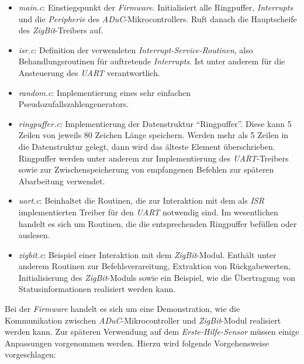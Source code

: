     \begin{itemize}
        \item{\emph{main.c}:} Einstiegspunkt der \emph{Firmware}. Initialisiert alle Ringpuffer, \emph{Interrupts} und 
                       die \emph{Peripherie} des \emph{ADuC}-Mikrocontrollers. Ruft danach die 
                       Hauptscheife des \emph{ZigBit}-Treibers auf.
        \item{\emph{isr.c}:}  Definition der verwendeten \emph{Interrupt-Service-Routinen}, also Behandlungsroutinen
                       für auftretende \emph{Interrupts}. Ist unter anderem für die Ansteuerung des \emph{UART} 
                       verantwortlich.
        \item{\emph{random.c}:} Implementierung eines sehr einfachen Pseudozufallszahlengenerators.
        \item{\emph{ringpuffer.c}:} Implementierung der Datenstruktur "`Ringpuffer"'. Diese kann 5 Zeilen
                             von jeweils 80 Zeichen Länge speichern. Werden mehr als 5 Zeilen in die
                             Datenstruktur gelegt, dann wird das älteste Element überschrieben.
                             Ringpuffer werden unter anderem zur Implementierung des \emph{UART}-Treibers
                             sowie zur Zwischenspeicherung von empfangenen Befehlen zur späteren
                             Abarbeitung verwendet.
        \item{\emph{uart.c}:} Beinhaltet die Routinen, die zur Interaktion mit dem als \emph{ISR} implementierten
                       Treiber für den \emph{UART} notwendig sind. Im wesentlichen handelt es sich um 
                       Routinen, die die entsprechenden Ringpuffer befüllen oder auslesen.
        \item{\emph{zigbit.c}:} Beispiel einer Interaktion mit dem \emph{ZigBit}-Modul. Enthält unter anderem Routinen
                         zur Befehlsverareitung, Extraktion von Rückgabewerten, Initialisierung des \emph{ZigBit}-Moduls
                         sowie ein Beispiel, wie die Übertragung von Statusinformationen realisiert werden kann.
    \end{itemize}

    Bei der \emph{Firmware} handelt es sich um eine Demonstration, wie die Kommunikation zwischen \emph{ADuC}-Mikrocontroller
    und \emph{ZigBit}-Modul realisiert werden kann. Zur späteren Verwendung auf dem \emph{Erste-Hilfe-Sensor} müssen 
    einige Anpassungen vorgenommen werden. Hierzu wird folgende Vorgehensweise vorgeschlagen:

